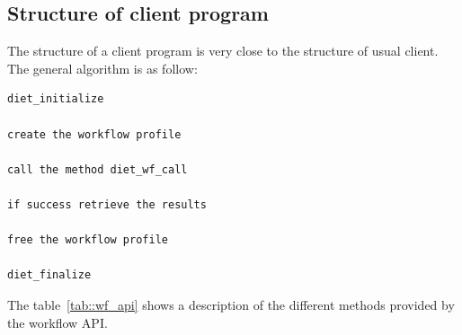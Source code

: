 \subsection{Structure of client program}
\label{sec:client_prg}

The structure of a client program is very close to the structure of
usual \diet client. The general algorithm is as follow:

\begin{verbatim}
diet_initialize

create the workflow profile

call the method diet_wf_call

if success retrieve the results

free the workflow profile

diet_finalize
\end{verbatim}

The table~\ref{tab::wf_api} shows a description of the different
methods provided by the \diet workflow API.

